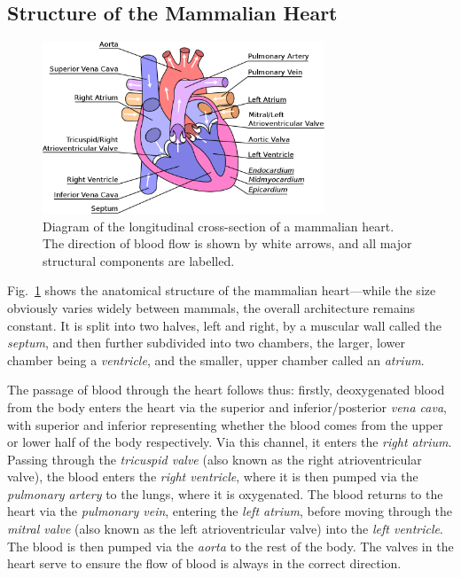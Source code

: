 \documentclass[../thesis-main.tex]{subfiles}
\begin{document}
\subsection{Structure of the Mammalian Heart}
\label{subsec:heart-structure}
\begin{figure}
 \centering
 \includegraphics[width=0.75\textwidth]{heart_labels}
 \caption[Structure of the mammalian heart]{Diagram of the longitudinal cross-section of a mammalian heart. The direction of blood flow is shown by white arrows, and all major structural components are labelled.}
 \label{fig:heart-structure}
\end{figure}
Fig.~\ref{fig:heart-structure} shows the anatomical structure of the mammalian heart---while the size obviously varies widely between mammals, the overall architecture remains constant. It is split into two halves, left and right, by a muscular wall called the \emph{septum}, and then further subdivided into two chambers, the larger, lower chamber being a \emph{ventricle}, and the smaller, upper chamber called an \emph{atrium}.

The passage of blood through the heart follows thus: firstly, deoxygenated blood from the body enters the heart via the superior and inferior/posterior \emph{vena cava}, with superior and inferior representing whether the blood comes from the upper or lower half of the body respectively. Via this channel, it enters the \emph{right atrium}. Passing through the \emph{tricuspid valve} (also known as the right atrioventricular valve), the blood enters the \emph{right ventricle}, where it is then pumped via the \emph{pulmonary artery} to the lungs, where it is oxygenated. The blood returns to the heart via the \emph{pulmonary vein}, entering the \emph{left atrium}, before moving through the \emph{mitral valve} (also known as the left atrioventricular valve) into the \emph{left ventricle}. The blood is then pumped via the \emph{aorta} to the rest of the body. The valves in the heart serve to ensure the flow of blood is always in the correct direction.
\end{document}
